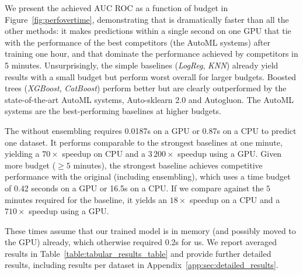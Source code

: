\documentclass{article}
\begin{document}
We present the achieved AUC ROC as a function of budget in Figure~\ref{fig:perfovertime},
%
demonstrating that \methodname{} is dramatically faster than all the other methods: it makes predictions within a single second on one GPU that tie with the performance of the best competitors (the AutoML systems) after training one hour, and that dominate the performance achieved by competitors in 5 minutes.
Unsurprisingly, the simple baselines (\textit{LogReg}, \textit{KNN}) already yield results with a small budget but perform worst overall for larger budgets.
Boosted trees (\textit{XGBoost}, \textit{CatBoost}) perform better but are clearly outperformed by the state-of-the-art AutoML systems, Auto-sklearn 2.0 and Autogluon. The AutoML systems are the best-performing baselines at higher budgets.

The \methodname{} without ensembling requires 0.0187s on a GPU or 0.87s on a CPU to predict one dataset.
It performs comparable to the strongest baselines at one minute, yielding a $70\times$ speedup on CPU and a $3\,200\times$ speedup using a GPU.
Given more budget ($\ge 5$ minutes), the strongest baseline achieves competitive performance with the original \methodname{} (including ensembling), which uses a time budget of 0.42 seconds on a GPU or 16.5s on a CPU.
If we compare \methodname{} against the $5$ minutes required for the baseline,
it yields an $18\times$ speedup on a CPU and a $710\times$ speedup using a GPU.

These times assume that our trained model is in memory (and possibly moved to the GPU) already, which otherwise required 0.2s for us.
We report averaged results in Table~\ref{table:tabular_results_table} and provide further detailed results, including results per dataset in Appendix~\ref{app:sec:detailed_results}.

\end{document}
